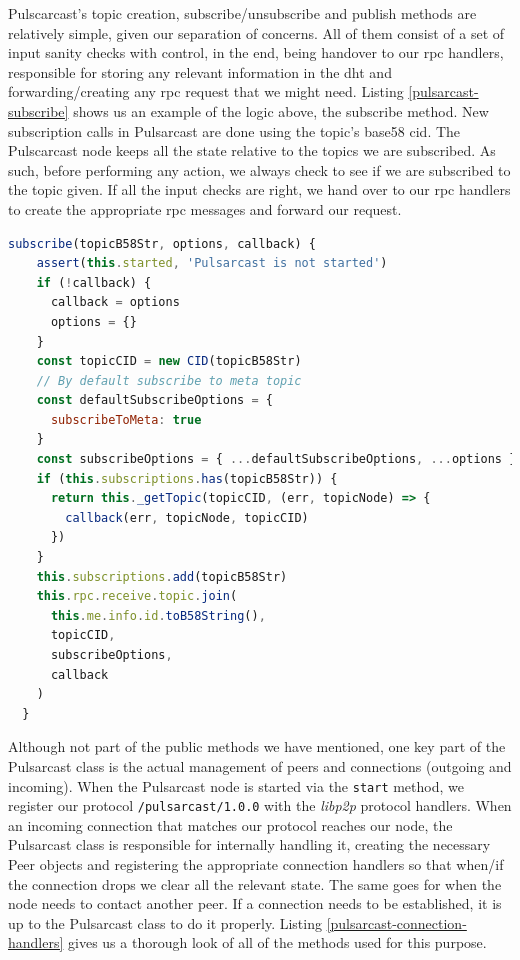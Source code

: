 Pulscarcast's topic creation, subscribe/unsubscribe and publish methods are
relatively simple, given our separation of concerns. All of them consist of a
set of input sanity checks with control, in the end, being handover to our
\acrshort{rpc} handlers, responsible for storing any relevant information in
the \acrshort{dht} and forwarding/creating any \acrshort{rpc} request that we
might need. Listing \ref{pulsarcast-subscribe} shows us an example of the logic
above, the subscribe method. New subscription calls in Pulsarcast are done
using the topic's base58 \acrshort{cid}. The Pulscarcast node keeps all the
state relative to the topics we are subscribed. As such, before performing any
action, we always check to see if we are subscribed to the topic given. If all
the input checks are right, we hand over to our \acrshort{rpc} handlers to
create the appropriate \acrshort{rpc} messages and forward our request.

\begin{lstlisting}[language=JavaScript, float, caption={Pulsarcast class subscribe method},label={pulsarcast-subscribe}]
  subscribe(topicB58Str, options, callback) {
    assert(this.started, 'Pulsarcast is not started')
    if (!callback) {
      callback = options
      options = {}
    }
    const topicCID = new CID(topicB58Str)
    // By default subscribe to meta topic
    const defaultSubscribeOptions = {
      subscribeToMeta: true
    }
    const subscribeOptions = { ...defaultSubscribeOptions, ...options }
    if (this.subscriptions.has(topicB58Str)) {
      return this._getTopic(topicCID, (err, topicNode) => {
        callback(err, topicNode, topicCID)
      })
    }
    this.subscriptions.add(topicB58Str)
    this.rpc.receive.topic.join(
      this.me.info.id.toB58String(),
      topicCID,
      subscribeOptions,
      callback
    )
  }
\end{lstlisting}

Although not part of the public methods we have mentioned, one key part of the
Pulsarcast class is the actual management of peers and connections (outgoing
and incoming). When the Pulsarcast node is started via the \verb|start| method,
we register our protocol \verb|/pulsarcast/1.0.0| with the \emph{libp2p}
protocol handlers. When an incoming connection that matches our protocol
reaches our node, the Pulsarcast class is responsible for internally handling
it, creating the necessary Peer objects and registering the appropriate
connection handlers so that when/if the connection drops we clear all the
relevant state. The same goes for when the node needs to contact another peer.
If a connection needs to be established, it is up to the Pulsarcast class to do
it properly. Listing \ref{pulsarcast-connection-handlers} gives us a thorough
look of all of the methods used for this purpose.

